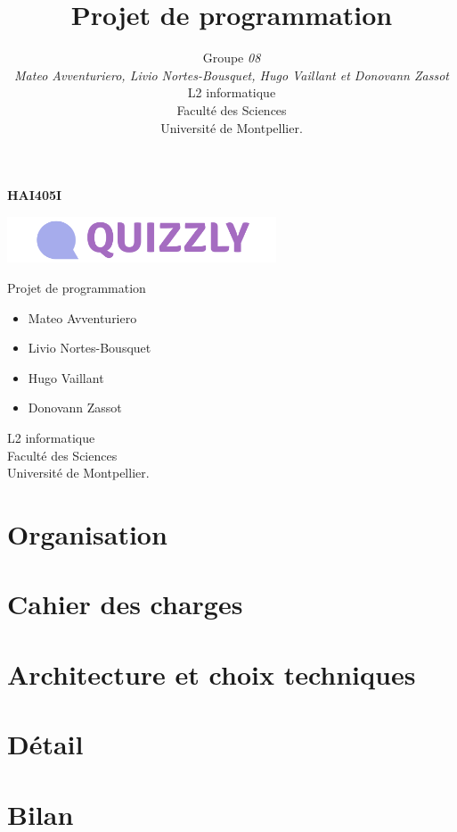 \documentclass[a4paper, 11pt]{article}
\title{Projet de programmation}
\author{Groupe \emph{08}\\
	\emph{Mateo Avventuriero, Livio Nortes-Bousquet, Hugo Vaillant et Donovann Zassot}\\
    L2 informatique\\
  Faculté des Sciences\\
Université de Montpellier.}
\begin{document}
\vspace*{1cm}
\centerline{\Huge\bf HAI405I}
\vspace*{1.5cm}
\begin{center}              	%
							

\includegraphics[width=8cm]{logo.png}   %


\end{center}
\vspace*{1.5cm}

\begin{mdframed}
\centerline{\Huge Projet de programmation}
\end{mdframed}

\vspace*{1.5cm}


\begin{itemize}
\item Mateo Avventuriero
\item Livio Nortes-Bousquet
\item Hugo Vaillant
\item Donovann Zassot
\end{itemize}
\vspace*{1.5cm}

\begin{center}
  L2 informatique\\
  Faculté des Sciences\\
Université de Montpellier.
\end{center}

\section{Organisation}


\section{Cahier des charges}


\section{Architecture et choix techniques}


\section{Détail}



\section{Bilan}

\end{document}
